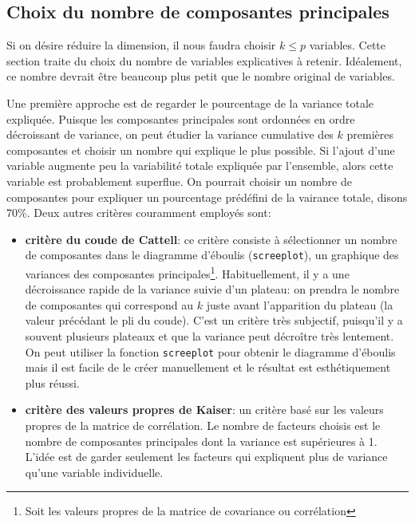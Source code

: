 \documentclass[
  11pt,
  letterpaper,
]{scrbook}
\providecommand{\tightlist}{%
  \setlength{\itemsep}{0pt}\setlength{\parskip}{0pt}}\usepackage{longtable,booktabs,array}
\theoremstyle{definition}
\theoremstyle{remark}
\begin{document}
\subsection{Choix du nombre de composantes
principales}\label{sec-acp-choix}

Si on désire réduire la dimension, il nous faudra choisir \(k \leq p\)
variables. Cette section traite du choix du nombre de variables
explicatives à retenir. Idéalement, ce nombre devrait être beaucoup plus
petit que le nombre original de variables.

Une première approche est de regarder le pourcentage de la variance
totale expliquée. Puisque les composantes principales sont ordonnées en
ordre décroissant de variance, on peut étudier la variance cumulative
des \(k\) premières composantes et choisir un nombre qui explique le
plus possible. Si l'ajout d'une variable augmente peu la variabilité
totale expliquée par l'ensemble, alors cette variable est probablement
superflue. On pourrait choisir un nombre de composantes pour expliquer
un pourcentage prédéfini de la vairance totale, disons 70\%. Deux autres
critères couramment employés sont:

\begin{itemize}
\tightlist
\item
  \textbf{critère du coude de Cattell}: ce critère consiste à
  sélectionner un nombre de composantes dans le diagramme d'éboulis
  (\texttt{screeplot}), un graphique des variances des composantes
  principales\footnote{Soit les valeurs propres de la matrice de
    covariance ou corrélation}. Habituellement, il y a une décroissance
  rapide de la variance suivie d'un plateau: on prendra le nombre de
  composantes qui correspond au \(k\) juste avant l'apparition du
  plateau (la valeur précédant le pli du coude). C'est un critère très
  subjectif, puisqu'il y a souvent plusieurs plateaux et que la variance
  peut décroître très lentement. On peut utiliser la fonction
  \texttt{screeplot} pour obtenir le diagramme d'éboulis mais il est
  facile de le créer manuellement et le résultat est esthétiquement plus
  réussi.
\item
  \textbf{critère des valeurs propres de Kaiser}: un critère basé sur
  les valeurs propres de la matrice de corrélation. Le nombre de
  facteurs choisis est le nombre de composantes principales dont la
  variance est supérieures à 1. L'idée est de garder seulement les
  facteurs qui expliquent plus de variance qu'une variable individuelle.
\end{itemize}
\end{document}
